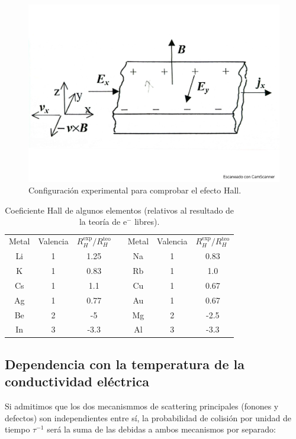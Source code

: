 \begin{figure}[h!] \centering
	\includegraphics[scale=0.35]{Cuerpo/Ch_06/Fotos libro 7.pdf}
	\caption{Configuración experimental para comprobar el efecto Hall.}
	\label{Fig:06-07}
\end{figure}  

\begin{table}[h!] \centering
	\begin{tabular}{ccc c ccc}
		Metal & Valencia & $R_H^{\text{exp}}/R_H^{\text{teo}}$ & & Metal & Valencia & $R_H^{\text{exp}}/R_H^{\text{teo}}$ \\ \cline{1-3} \cline{5-7} 
		Li & 1 & 1.25 & & Na & 1 & 0.83 \\
		K & 1 & 0.83 & & Rb & 1 & 1.0 \\
		Cs & 1 & 1.1 & & Cu & 1 & 0.67 \\
		Ag & 1 & 0.77 & & Au & 1 & 0.67 \\
		Be & 2 & -5 & & Mg & 2 & -2.5 \\
		In & 3 & -3.3 & & Al & 3 & -3.3 
	\end{tabular}
	\caption{Coeficiente Hall de algunos elementos (relativos al resultado de la teoría de e$^-$ libres).}
	\label{Tab:06-03}
\end{table}



\subsection{Dependencia con la temperatura de la conductividad eléctrica}

Si admitimos que los dos mecanismmos de scattering principales (fonones y defectos) son independientes entre sí, la probabilidad de colisión por unidad de tiempo $\tau^{-1}$ será la suma de las debidas a ambos mecanismos por separado:

